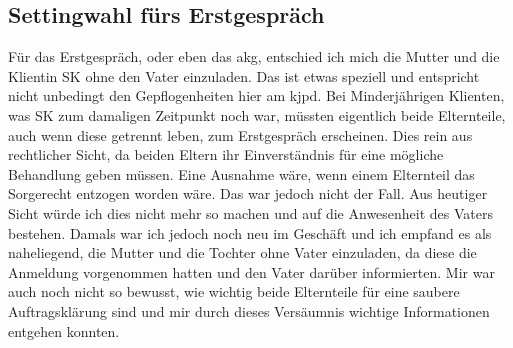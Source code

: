 
\subsection{Settingwahl fürs Erstgespräch} 
Für das Erstgespräch, oder eben das \ac{akg}, entschied ich mich die Mutter und die Klientin SK ohne den Vater einzuladen. Das ist etwas speziell und entspricht nicht unbedingt den Gepflogenheiten hier am \ac{kjpd}. Bei Minderjährigen Klienten, was SK zum damaligen Zeitpunkt noch war, müssten eigentlich beide Elternteile, auch wenn diese getrennt leben, zum Erstgespräch erscheinen. Dies rein aus rechtlicher Sicht, da beiden Eltern ihr Einverständnis für eine mögliche Behandlung geben müssen. Eine Ausnahme wäre, wenn einem Elternteil das Sorgerecht entzogen worden wäre. Das war jedoch nicht der Fall. Aus heutiger Sicht würde ich dies nicht mehr so machen und auf die Anwesenheit des Vaters bestehen. Damals war ich jedoch noch neu im Geschäft und ich empfand es als naheliegend, die Mutter und die Tochter ohne Vater einzuladen, da diese die Anmeldung vorgenommen hatten und den Vater darüber informierten. Mir war auch noch nicht so bewusst, wie wichtig beide Elternteile für eine saubere Auftragsklärung sind und mir durch dieses Versäumnis wichtige Informationen entgehen konnten.










